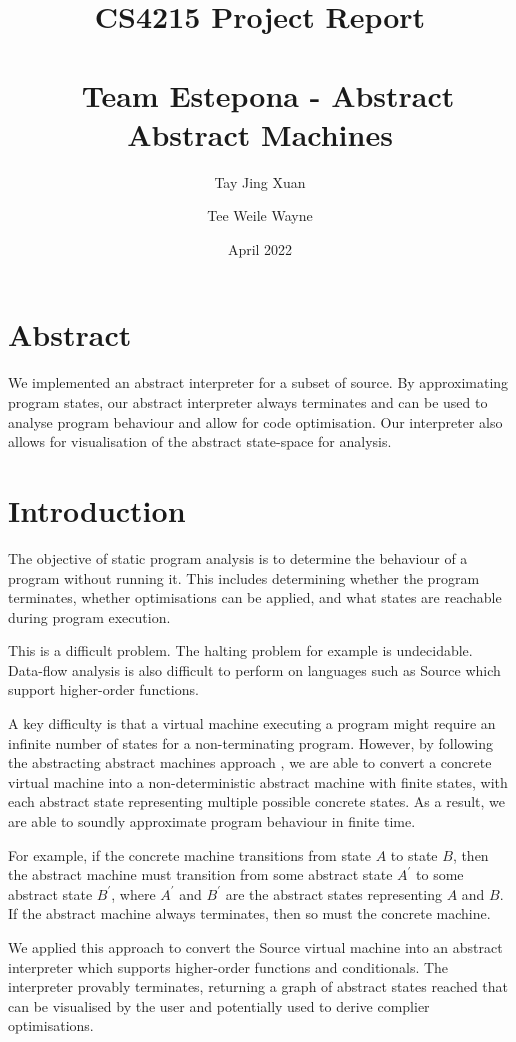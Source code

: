\documentclass[12pt]{article}
\title{CS4215 Project Report \\\ \\\
Team Estepona - Abstract Abstract Machines}
\author{Tay Jing Xuan \and Tee Weile Wayne}
\date{April 2022}
\begin{document}
\maketitle

\section{Abstract}
We implemented an abstract interpreter for a subset of source. By approximating program states, our abstract interpreter always terminates and can be used to analyse program behaviour and allow for code optimisation. Our interpreter also allows for visualisation of the abstract state-space for analysis.

\section{Introduction}
The objective of static program analysis is to determine the behaviour of a program without running it. This includes determining whether the program terminates, whether optimisations can be applied, and what states are reachable during program execution.

This is a difficult problem. The halting problem for example is undecidable. Data-flow analysis is also difficult to perform on languages such as Source which support higher-order functions.

A key difficulty is that a virtual machine executing a program might require an infinite number of states for a non-terminating program. However, by following the abstracting abstract machines approach \cite{aam}, we are able to convert a concrete virtual machine into a non-deterministic abstract machine with finite states, with each abstract state representing multiple possible concrete states. As a result, we are able to soundly approximate program behaviour in finite time.

For example, if the concrete machine transitions from state $A$ to state $B$, then the abstract machine must transition from some abstract state $A^{\prime}$ to some abstract state $B^{\prime}$, where $A^{\prime}$ and $B^{\prime}$ are the abstract states representing $A$ and $B$. If the abstract machine always terminates, then so must the concrete machine.

We applied this approach to convert the Source virtual machine into an abstract interpreter which supports higher-order functions and conditionals. The interpreter provably terminates, returning a graph of abstract states reached that can be visualised by the user and potentially used to derive complier optimisations.
\end{document}
